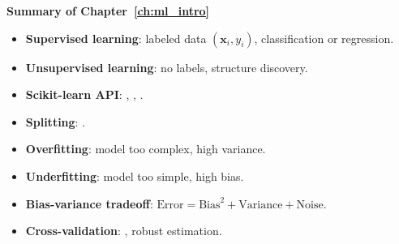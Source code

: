 \begin{keyformulas}
\textbf{Summary of Chapter~\ref{ch:ml_intro}}
\begin{itemize}
    \item \textbf{Supervised learning}: labeled data $(\mathbf{x}_i, y_i)$, classification or regression.
    \item \textbf{Unsupervised learning}: no labels, structure discovery.
    \item \textbf{Scikit-learn API}: , , .
    \item \textbf{Splitting}: .
    \item \textbf{Overfitting}: model too complex, high variance.
    \item \textbf{Underfitting}: model too simple, high bias.
    \item \textbf{Bias-variance tradeoff}: $\text{Error} = \text{Bias}^2 + \text{Variance} + \text{Noise}$.
    \item \textbf{Cross-validation}: , robust estimation.
\end{itemize}
\end{keyformulas}

